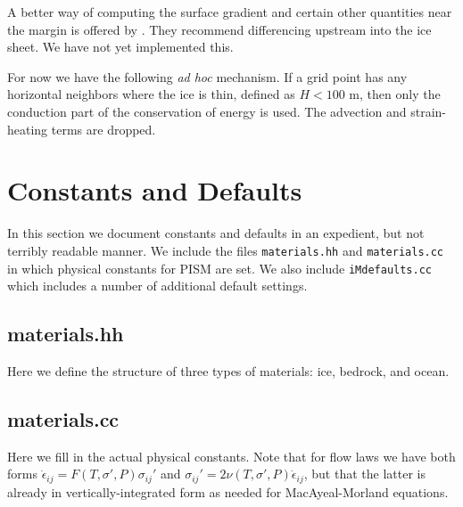 \documentclass[12pt,final]{amsart}%
\theoremstyle{plain}
\theoremstyle{definition}
\theoremstyle{remark}
\def\eps{\epsilon}
\begin{document}
A better way of computing the surface gradient and certain other quantities near the margin is offered by \citet{SaitoMargin}.  They recommend differencing upstream into the ice sheet.  We have not yet implemented this.

For now we have the following \emph{ad hoc} mechanism.  If a grid point has any horizontal neighbors where the ice is thin, defined as $H < 100$ m, then only the conduction part of the conservation of energy is used.  The advection and strain-heating terms are dropped.



\section{Constants and Defaults}

In this section we document constants and defaults in an expedient, but not terribly readable manner.  We include the files \texttt{materials.hh} and \texttt{materials.cc} in which physical constants for PISM are set.  We also include \texttt{iMdefaults.cc} which includes a number of additional default settings.

\subsection*{materials.hh}  Here we define the structure of three types of materials: ice, bedrock, and ocean.

\scriptsize
\begin{quote}

\end{quote}
\normalsize

\subsection*{materials.cc}  Here we fill in the actual physical constants.  Note that for flow laws we have both forms $\dot \eps_{ij} = F(T,\sigma',P) \sigma_{ij}'$ and $\sigma_{ij}' = 2 \nu(T,\sigma',P) \dot \eps_{ij}$, but that the latter is already in vertically-integrated form as needed for MacAyeal-Morland equations.
\end{document}
